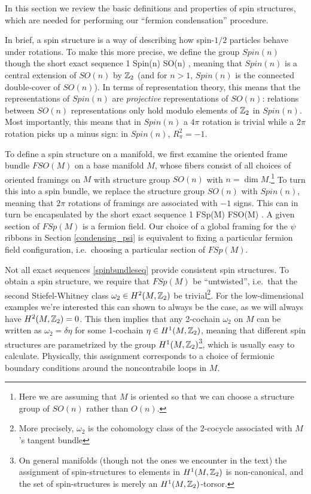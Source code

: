 
\kwsep

In this section we review the basic definitions and properties of spin structures, which are needed for performing our ``fermion condensation'' procedure.   


In brief, a spin structure is a way of describing how spin-$1/2$ particles behave under rotations. 
To make this more precise, we define the group $Spin(n)$ though the short exact sequence
\be \label{spin_gp_seq} 1 \ra \zt \ra Spin(n) \ra SO(n) ,\ee
meaning that $Spin(n)$ is a central extension of $SO(n)$ by $\mathbb{Z}_2$ (and for $n>1$, $Spin(n)$ is the connected double-cover of $SO(n)$).  
In terms of representation theory, this means that the representations of $Spin(n)$ are {\it projective} representations of $SO(n)$: relations between $SO(n)$ representations only hold modulo elements of $\mathbb{Z}_2$ in $Spin(n)$. Most importantly, this means that in $Spin(n)$ a $4\pi$ rotation is trivial while a $2\pi$ rotation picks up a minus sign: in $Spin(n)$, $R_\pi^2 = -1$.  

To define a spin structure on a manifold, we first examine the oriented frame bundle $FSO(M)$ on a base manifold $M$, whose fibers consist of all choices of oriented framings on $M$ with structure group $SO(n)$ with $n=\dim M$.\footnote{Here we are assuming that 
$M$ is oriented so that we can choose a structure group of $SO(n)$ rather than $O(n)$.} 
To turn this into a spin bundle, we replace the structure group $SO(n)$ with $Spin(n)$, meaning that $2\pi$ rotations of framings are associated with $-1$ signs. 
This can in turn be encapsulated by the short exact sequence 
\be \label{spinbundleseq} 1 \ra \zt \ra FSp(M) \ra FSO(M) .\ee
A given section of $FSp(M)$ is a fermion field. Our choice of a global framing for the $\psi$ ribbons in Section \ref{condensing_psi} is equivalent to fixing a particular fermion field configuration, i.e.\ choosing a particular section of $FSp(M)$. 

Not all exact sequences \eqref{spinbundleseq} provide consistent spin structures. To obtain a spin structure, we require that $FSp(M)$ be ``untwisted'', i.e.\ 
that the second Stiefel-Whitney class $\omega_2 \in H^2(M,\mathbb{Z}_2)$ be trivial\footnote{More precisely, $\omega_2$ is the cohomology class of the 2-cocycle associated with $M$'s tangent bundle}. For the low-dimensional examples we're interested this can shown to always be the case, as we will always have $H^2(M,\mathbb{Z}_2) = 0$. This then implies that any 2-cochain $\omega_2$ on $M$ can be written as $\omega_2 = \delta \eta$ for some 1-cochain $\eta \in H^1(M,\mathbb{Z}_2)$, meaning that different spin structures are parametrized by the group $H^1(M,\mathbb{Z}_2)$\footnote{On general manifolds (though not the ones we encounter in the text) the assignment of spin-structures to elements in $H^1(M,\mathbb{Z}_2)$ is non-canonical, and the set of spin-structures is merely an $H^1(M,\mathbb{Z}_2)$-torsor.}, which is usually easy to calculate. Physically, this assignment corresponds to a choice of fermionic boundary conditions around the noncontrabile loops in $M$. 

